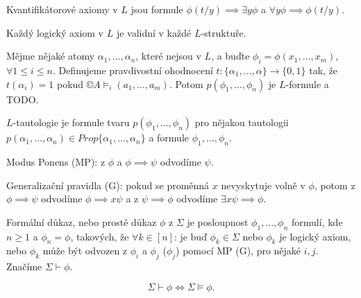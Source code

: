 \documentclass[12pt]{article}                   %
\begin{document}

        \begin{definice}
            Kvantifikátorové axiomy v $L$ jsou formule $\phi(t/y) \implies \exists y\phi$ a $\forall y \phi \implies \phi(t/y)$.
        \end{definice}

        \begin{veta}
            Každý logický axiom v $L$ je validní v každé $L$-struktuře.

            \begin{lemmain}
                Mějme nějaké atomy $\alpha_1, …, \alpha_n$, které nejsou v $L$, a buďte $\phi_i = \phi(x_1, …, x_m)$, $\forall 1 ≤ i ≤ n$. Definujeme pravdivostní ohodnocení $t:\{\alpha_1, …, \alpha\} \rightarrow \{0, 1\}$ tak, že $t(\alpha_i) = 1$ pokud $©A \models_i(a_1, …, a_m)$. Potom $p(\phi_1, …, \phi_n)$ je $L$-formule a TODO.
            \end{lemmain}

            \begin{definicein}[$L$-tautologie]
                $L$-tautologie je formule tvaru $p(\phi_1, …, \phi_n)$ pro nějakou tautologii $p(\alpha_1, …, \alpha_n) \in Prop\{\alpha_1, …, \alpha_n\}$ a formule $\phi_1, …, \phi_n$.
            \end{definicein}
        \end{veta}

        \begin{definice}
            Modus Ponens (MP): z $\phi$ a $\phi \implies \psi$ odvodíme $\psi$.

            Generalizační pravidla (G): pokud se proměnná $x$ nevyskytuje volně v $\phi$, potom z $\phi \implies \psi$ odvodíme $\phi \implies x\psi$ a z $\psi \implies \phi$ odvodíme $\exists x \psi \implies \phi$.
        \end{definice}

        \begin{definice}[Důkaz]
            Formální důkaz, nebo prostě důkaz $\phi$ z $\Sigma$ je posloupnost $\phi_1, …, \phi_n$ formulí, kde $n ≥ 1$ a $\phi_n = \phi$, takových, že $\forall k \in [n]$: je buď $\phi_k \in \Sigma$ nebo $\phi_k$ je logický axiom, nebo $\phi_k$ může být odvozen z $\phi_i$ a $\phi_j$ ($\phi_j$) pomocí MP (G), pro nějaké $i, j$. Značíme $\Sigma \vdash \phi$.
        \end{definice}

        \begin{veta}
            $$ \Sigma \vdash \phi \Leftrightarrow \Sigma \models \phi. $$ 
        \end{veta}
\end{document}

